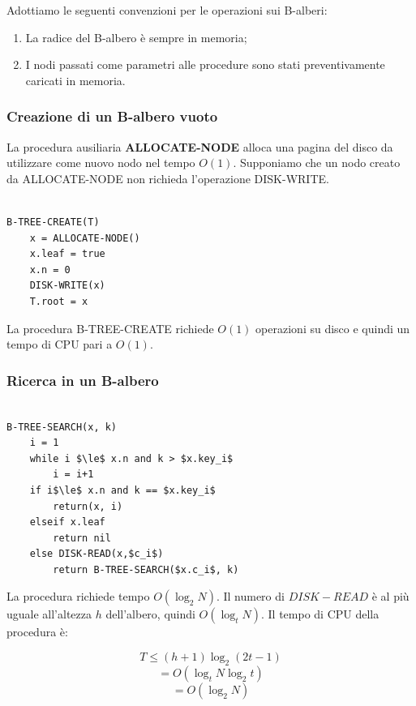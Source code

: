 Adottiamo le seguenti convenzioni per le operazioni sui B-alberi:

\begin{enumerate}

\item La radice del B-albero è sempre in memoria;
\item I nodi passati come parametri alle procedure sono stati preventivamente caricati in memoria.

\end{enumerate}

\subsubsection{Creazione di un B-albero vuoto}

La procedura ausiliaria \textbf{ALLOCATE-NODE} alloca una pagina del disco da utilizzare come nuovo nodo nel tempo $O(1)$. Supponiamo che un nodo creato da ALLOCATE-NODE non richieda l'operazione DISK-WRITE.

\begin{lstlisting}[caption=Creazione di un B-albero]

B-TREE-CREATE(T)
	x = ALLOCATE-NODE()
	x.leaf = true
	x.n = 0
	DISK-WRITE(x)
	T.root = x

\end{lstlisting}

La procedura B-TREE-CREATE richiede $O(1)$ operazioni su disco e quindi un tempo di CPU pari a $O(1)$.

\subsubsection{Ricerca in un B-albero}

\begin{lstlisting}[mathescape=true, caption=Ricerca in un B-albero]

B-TREE-SEARCH(x, k)
	i = 1
	while i $\le$ x.n and k > $x.key_i$
		i = i+1
	if i$\le$ x.n and k == $x.key_i$
		return(x, i)
	elseif x.leaf
		return nil
	else DISK-READ(x,$c_i$)
		return B-TREE-SEARCH($x.c_i$, k)

\end{lstlisting}

La procedura richiede tempo $O(\log_2 N)$. Il numero di $DISK-READ$ è al più uguale all'altezza $h$ dell'albero, quindi $O(\log_tN)$. Il tempo di CPU della procedura è:

$$T\le(h+1)\log_2(2t-1)$$
$$=O(\log_tN\log_2t)$$
$$=O(\log_2N)$$

